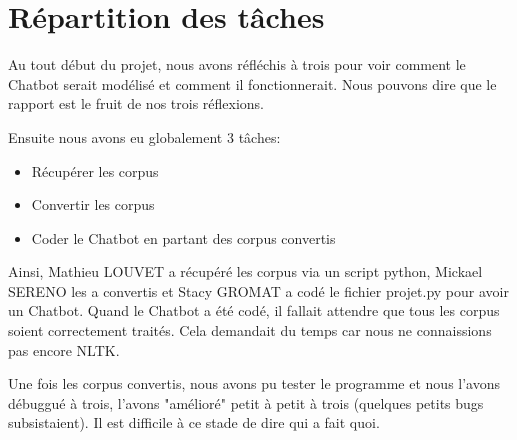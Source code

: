\section{Répartition des tâches}
	Au tout début du projet, nous avons réfléchis à trois pour voir comment le Chatbot serait modélisé et comment il fonctionnerait. Nous pouvons dire que le rapport est le fruit de nos trois réflexions.

	Ensuite nous avons eu globalement 3 tâches:
	\begin{itemize}
		\item Récupérer les corpus
		\item Convertir les corpus
		\item Coder le Chatbot en partant des corpus convertis
	\end{itemize}

	Ainsi, Mathieu LOUVET a récupéré les corpus via un script python, Mickael SERENO les a convertis et Stacy GROMAT a codé le fichier projet.py pour avoir un Chatbot.
	Quand le Chatbot a été codé, il fallait attendre que tous les corpus soient correctement traités. Cela demandait du temps car nous ne connaissions pas encore NLTK.

	Une fois les corpus convertis, nous avons pu tester le programme et nous l'avons débuggué à trois, l'avons "amélioré" petit à petit à trois (quelques petits bugs subsistaient). Il est difficile à ce stade de dire qui a fait quoi.
